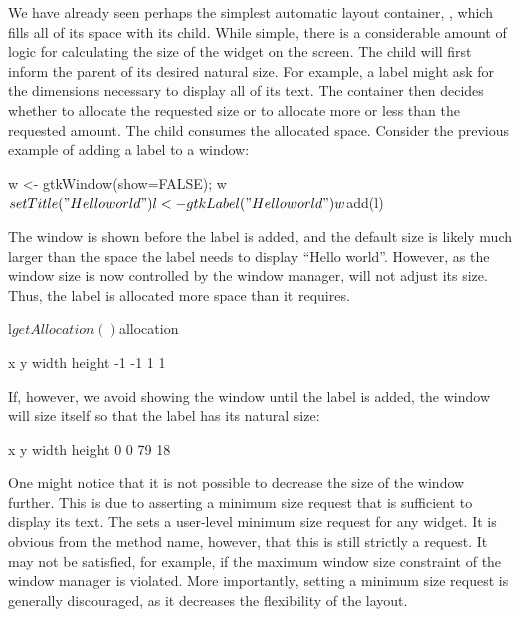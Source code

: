We have already seen perhaps the simplest automatic layout container,
, which fills all of its space with its child. While
simple, there is a considerable amount of logic for calculating the
size of the widget on the screen. The child will first inform the
parent of its desired natural size. For example, a label might ask for
the dimensions necessary to display all of its text. The container
then decides whether to allocate the requested size or to allocate
more or less than the requested amount. The child consumes the
allocated space. Consider the previous example of adding a label to a
window:
\begin{Schunk}
\begin{Sinput}
 w <- gtkWindow(show=FALSE); w$setTitle("Hello world")
 l <- gtkLabel("Hello world")
 w$add(l)
\end{Sinput}
\end{Schunk}

%
The window is shown before the label is added, and the default size is
likely much larger than the space the label needs to display ``Hello
world''. However, as the window size is now controlled by the window
manager,  will not adjust its size. Thus, the label
is allocated more space than it requires.
\begin{Schunk}
\begin{Sinput}
 l$getAllocation()$allocation
\end{Sinput}
\end{Schunk}
\begin{Schunk}
\begin{Soutput}
     x      y  width height 
    -1     -1      1      1 
\end{Soutput}
\end{Schunk}
If, however, we avoid showing the window until the label is added, the
window will size itself so that the label has its natural size:
\begin{Schunk}
\end{Schunk}
\begin{Schunk}
\begin{Soutput}
     x      y  width height 
     0      0     79     18 
\end{Soutput}
\end{Schunk}
%
One might notice that it is not possible to decrease the size of the
window further. This is due to  asserting a minimum
size request that is sufficient to display its text. The
 sets a user-level minimum size 
request for any widget. It is obvious from the method name, however,
that this is still strictly a request. It may not be satisfied, for
example, if the maximum window size constraint of the window manager
is violated. More importantly, setting a minimum size request is
generally discouraged, as it decreases the flexibility of the layout.


